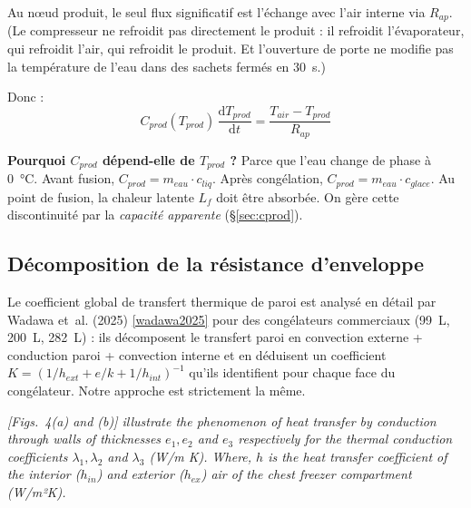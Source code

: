 \documentclass[11pt,a4paper]{article}
\begin{document}
\begin{demo}
Au nœud produit, le seul flux significatif est l'échange avec l'air interne via $R_{ap}$.
(Le compresseur ne refroidit pas directement le produit : il refroidit l'évaporateur, qui
refroidit l'air, qui refroidit le produit. Et l'ouverture de porte ne modifie pas la
température de l'eau dans des sachets fermés en \SI{30}{\second}.)

Donc :
\begin{equation}
\boxed{\;C_{prod}(T_{prod})\,\frac{\mathrm{d}T_{prod}}{\mathrm{d}t}
= \frac{T_{air}-T_{prod}}{R_{ap}}\;}
\label{eq:eq2}
\end{equation}
\end{demo}

\textbf{Pourquoi $C_{prod}$ dépend-elle de $T_{prod}$ ?} Parce que l'eau change de phase à
\SI{0}{\celsius}. Avant fusion, $C_{prod} = m_{eau}\cdot c_{liq}$. Après congélation,
$C_{prod} = m_{eau}\cdot c_{glace}$. Au point de fusion, la chaleur latente $L_f$ doit
être absorbée. On gère cette discontinuité par la \emph{capacité apparente} (\S\ref{sec:cprod}).

\subsection{Décomposition de la résistance d'enveloppe}\label{sec:rdecomp}

Le coefficient global de transfert thermique de paroi est analysé en détail par Wadawa
et~al. (2025) \ref{wadawa2025} pour des congélateurs commerciaux (99~L, 200~L, 282~L) :
ils décomposent le transfert paroi en convection externe + conduction paroi + convection
interne et en déduisent un coefficient $K = (1/h_{ext} + e/k + 1/h_{int})^{-1}$ qu'ils
identifient pour chaque face du congélateur. Notre approche est strictement la même.

\begin{tcolorbox}[breakable,enhanced jigsaw,colback=yellow!10,colframe=yellow!50!black,boxrule=0.4pt,arc=2pt,
title=\textbf{Extrait textuel — Wadawa et~al.\ (2025) \ref{wadawa2025}, section 2.1.1}]
\og{} \emph{[Figs.~4(a) and (b)] illustrate the phenomenon of heat transfer by conduction
through walls of thicknesses $e_1, e_2$ and $e_3$ respectively for the thermal conduction
coefficients $\lambda_1, \lambda_2$ and $\lambda_3$ (W/m K). Where, $h$ is the heat
transfer coefficient of the interior ($h_{in}$) and exterior ($h_{ex}$) air of the chest
freezer compartment (W/m²K).} \fg{}
\end{tcolorbox}
\end{document}
